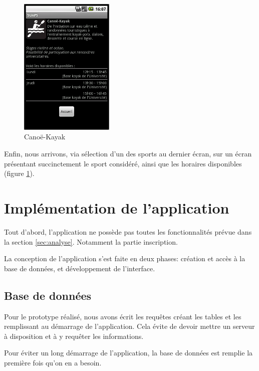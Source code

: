 \documentclass[french, titlepage, 11pt, a4paper]{article}
\begin{document}
	\begin{figure}[htb]
		\centering
		\includegraphics[width=0.4\textwidth]{canoekayak.png}
		\caption{Canoë-Kayak}
		\label{fig:canoekayak}
	\end{figure}

	Enfin, nous arrivons, via sélection d'un des sports au dernier écran, sur un
	écran présentant succinctement le sport considéré, ainsi que les horaires
	disponibles (figure \ref{fig:canoekayak}).



\section{Implémentation de l'application}

    Tout d'abord, l'application ne possède pas toutes les fonctionnalités prévue
    dans la section \ref{sec:analyse}. Notamment la partie inscription.


    La conception de l'application s'est faite en deux phases: création et accès
    à la base de données, et développement de l'interface.

    \subsection{Base de données}

        Pour le prototype réalisé, nous avons écrit les requêtes créant les
        tables et les remplissant au démarrage de l'application. Cela évite de
        devoir mettre un serveur à disposition et à y requêter les informations.

        Pour éviter un long démarrage de l'application, la base de données est
        remplie la première fois qu'on en a besoin.
\end{document}
